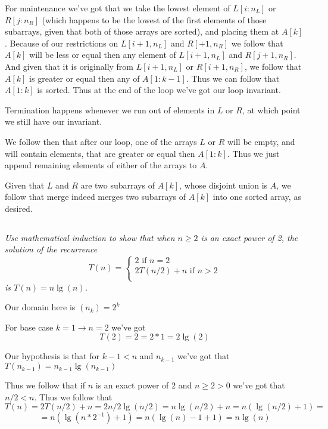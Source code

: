 \documentclass[11pt,oneside,titlepage]{book}
\begin{document}
For maintenance we've got that we take the lowest element of $L[i:n_L]$ or
$R[j:n_R]$ (which happens to be the lowest  of the  first elements of those subarrays, given that
both of those arrays are sorted), and placing them at $A[k]$. Because of
our restrictions on $L[i + 1, n_L]$ and $R[ + 1, n_R]$ we follow that $A[k]$ will be less or
equal then any element of $L[i + 1, n_L]$ and $R[j + 1, n_R]$. And given that it
is originally from $L[i + 1, n_L]$ or $R[i + 1, n_R]$, we follow that $A[k]$ is
greater or equal then any of $A[1:k - 1]$. Thus we can follow that $A[1:k]$ is sorted.
Thus at the end of the loop we've got our loop invariant.

Termination happens whenever we run out of elements in $L$ or $R$, at which point we still have
our invariant.

We follow then that after our loop, one of the arrays $L$ or $R$ will be empty, and
will contain elements, that are greater or equal then $A[1:k]$. Thus we just append
remaining elements of either of the arrays to $A$.


Given that $L$ and $R$ are two subarrays of $A[k]$, whose disjoint union is $A$, we follow that
merge indeed merges two subarrays of $A[k]$ into one sorted array, as desired.

\subsection{}

\textit{Use mathematical induction to show that when $n \geq 2$ is an exact power of 2, the
  solution of the recurrence }
$$T(n) =
\begin{cases}
  2 \text{ if }n = 2 \\
  2T(n/2) + n \text{ if } n > 2\\
\end{cases}
$$
\textit{is $T(n) = n \lg(n)$.}

Our domain here is $(n_k) = 2^k$

For base case $k = 1 \to n = 2$ we've got
$$T(2) = 2 = 2 * 1 = 2 \lg(2)$$

Our hypothesis is that for $k - 1 < n$ and $n_{k - 1}$ we've got that
$T(n_{k - 1}) = n_{k - 1} \lg(n_{k - 1})$

Thus we follow that if $n$ is an exact power of $2$ and $n \geq 2 > 0$ we've got that
$n/2 < n$. Thus we follow that
$$T(n) = 2T(n/2) + n = 2 n/2 \lg(n/2) = n \lg(n/2) + n = n(\lg(n/2) + 1) =$$
$$= n(\lg(n * 2^{-1}) + 1) =
n(\lg(n) - 1 + 1) = n \lg(n)$$
\end{document}
